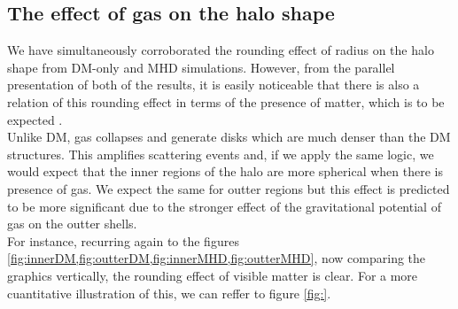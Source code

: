 \subsection{The effect of gas on the halo shape}
We have simultaneously corroborated the rounding effect of radius on the halo shape from DM-only and MHD simulations. However, from the parallel presentation of both of the results, it is easily noticeable that there is also a relation of this rounding effect in terms of the presence of matter, which is to be expected \cite{effect of gas}.\\

 Unlike DM, gas collapses and generate disks which are much denser than the DM structures. This amplifies scattering events and, if we apply the same logic, we would expect that the inner regions of the halo are more spherical when there is presence of gas. We expect the same for outter regions but this effect is predicted to be more significant due to the stronger effect of the gravitational potential of gas on the outter shells.\\

For instance, recurring again to the figures \ref{fig:innerDM,fig:outterDM,fig:innerMHD,fig:outterMHD}, now comparing the graphics vertically, the rounding effect of visible matter is clear. For a more cuantitative illustration of this, we can reffer to figure \ref{fig:}. \\


